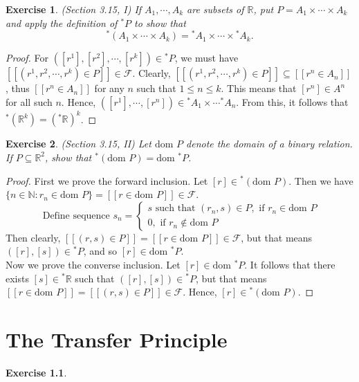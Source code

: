 \documentclass[a4paper, 11pt]{book}
\theoremstyle{plain}
\newtheorem{exercise}{Exercise}[chapter]
\theoremstyle{plain}
\newcommand{\mc}{\mathcal}
\newcommand{\N}{\mathbb{N}}
\newcommand{\R}{\mathbb{R}}
\newcommand{\hyp}{{}^*}
\newcommand{\dom}{\text{dom }}
\begin{document}
  \begin{exercise}
    (Section 3.15, I)
    If $A_1,\cdots, A_k$ are subsets of $\R$, put $P=A_1\times \cdots \times A_k$ and apply the definition of $\hyp P$ to show that $$ \hyp (A_1 \times \cdots \times A_k)=\hyp A_1 \times \cdots \times \hyp A_k.$$
  \end{exercise}
  \begin{proof}
    For $([r^1], [r^2], \cdots, [r^k]) \in \hyp P$, we must have $[[(r^1, r^2, \cdots, r^k) \in P]] \in \mc{F}$. Clearly, $[[(r^1, r^2, \cdots, r^k) \in P]] \subseteq [[r^n \in A_n]]$, thus $[[r^n \in A_n]]$ for any $n$ such that $1 \leq n \leq k$. This means that $[r^n] \in A^n$ for all such $n$. Hence, $([r^1], \cdots, [r^n]) \in \hyp A_1 \times \cdots \hyp A_n$. From this, it follows that $\hyp (\R^k)=(\hyp \R)^k$.
  \end{proof}

  \begin{exercise}
    (Section 3.15, II)
    Let $\dom P$ denote the domain of a binary relation. If $P \subseteq \R^2$, show that $\hyp (\dom P)= \dom \hyp P$.
  \end{exercise}
  \begin{proof}
    First we prove the forward inclusion. Let $[r] \in \hyp (\dom P)$. Then we have $\{n \in \N: r_n \in \dom P\}=[[r \in \dom P]] \in \mc{F}$. $$\text{ Define sequence } s_n = \begin{cases} s \text{ such that } (r_n, s) \in P, \text{ if } r_n \in \dom P \\ 0, \text{ if } r_n \notin \dom P \end{cases}$$ Then clearly, $[[(r,s) \in P]]=[[r \in \dom P]] \in \mc{F}$, but that means $([r], [s]) \in \hyp P$, and so $[r] \in \dom \hyp P$. \\
    Now we prove the converse inclusion. Let $[r] \in \dom \hyp P$. It follows that there exists $[s] \in \hyp \R$ such that $([r], [s]) \in \hyp P$, but that means $[[r \in \dom P]]=[[(r,s) \in P]] \in \mc{F}$. Hence, $[r] \in \hyp (\dom P)$.
  \end{proof}

\chapter{The Transfer Principle}

  \begin{exercise}
    
  \end{exercise}
\end{document}
